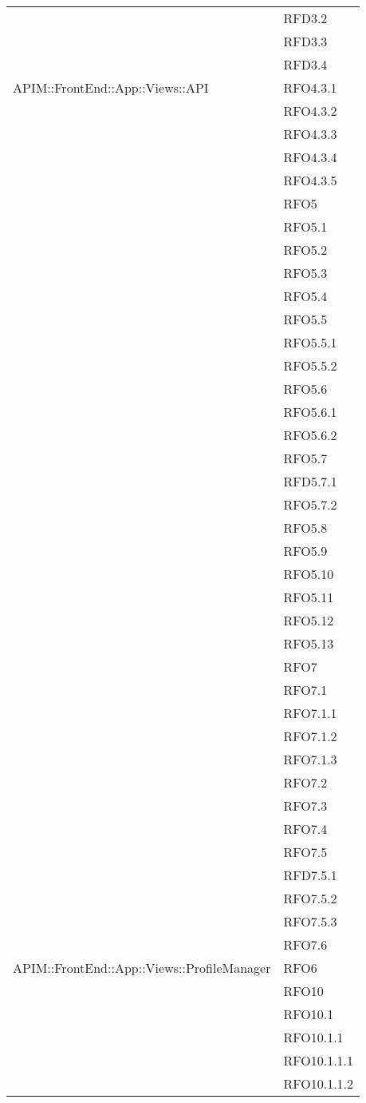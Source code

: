 \begin{longtable}{ p{12cm} | p{4cm} }
	& RFD3.2 \\
	& RFD3.3 \\
	& RFD3.4 \\
	\hline
	APIM::FrontEnd::App::Views::API
	& RFO4.3.1 \\
	& RFO4.3.2 \\
	& RFO4.3.3 \\
	& RFO4.3.4 \\
	& RFO4.3.5 \\
	& RFO5 \\
	& RFO5.1 \\
	& RFO5.2 \\
	& RFO5.3 \\
	& RFO5.4 \\
	& RFO5.5 \\
	& RFO5.5.1 \\
	& RFO5.5.2 \\
	& RFO5.6 \\
	& RFO5.6.1 \\
	& RFO5.6.2 \\
	& RFO5.7 \\
	& RFD5.7.1 \\
	& RFO5.7.2 \\
	& RFO5.8 \\
	& RFO5.9 \\
	& RFO5.10 \\
	& RFO5.11 \\
	& RFO5.12 \\
	& RFO5.13 \\
	& RFO7 \\
	& RFO7.1 \\
	& RFO7.1.1 \\
	& RFO7.1.2 \\
	& RFO7.1.3 \\
	& RFO7.2 \\
	& RFO7.3 \\
	& RFO7.4 \\
	& RFO7.5 \\
	& RFD7.5.1 \\
	& RFO7.5.2 \\
	& RFO7.5.3 \\
	& RFO7.6 \\
	\hline
	APIM::FrontEnd::App::Views::ProfileManager
	& RFO6 \\
	& RFO10 \\
	& RFO10.1 \\
	& RFO10.1.1 \\
	& RFO10.1.1.1 \\
	& RFO10.1.1.2 \\

\end{longtable}
